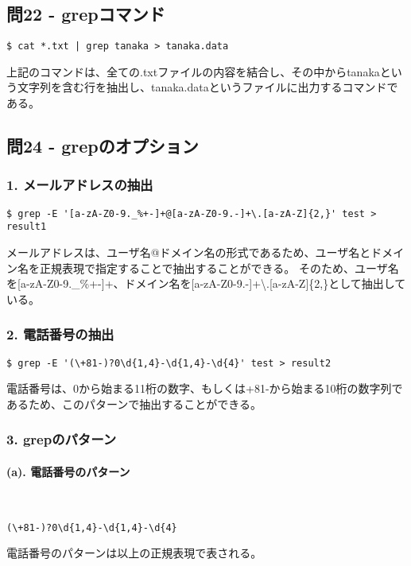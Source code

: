 \documentclass[a4paper,11pt]{jsarticle}
\begin{document}
\subsection*{問22 - grepコマンド}
\begin{lstlisting}[caption=問22の解答]
    $ cat *.txt | grep tanaka > tanaka.data
\end{lstlisting}
上記のコマンドは、全ての.txtファイルの内容を結合し、その中からtanakaという文字列を含む行を抽出し、tanaka.dataというファイルに出力するコマンドである。

\subsection*{問24 - grepのオプション}
\subsubsection*{1. メールアドレスの抽出}
\begin{lstlisting}[caption=問24-1の解答]
    $ grep -E '[a-zA-Z0-9._%+-]+@[a-zA-Z0-9.-]+\.[a-zA-Z]{2,}' test > result1
\end{lstlisting}
メールアドレスは、ユーザ名@ドメイン名の形式であるため、ユーザ名とドメイン名を正規表現で指定することで抽出することができる。
そのため、ユーザ名を[a-zA-Z0-9.\_\%+-]+、ドメイン名を[a-zA-Z0-9.-]+\textbackslash.[a-zA-Z]\{2,\}として抽出している。

\subsubsection*{2. 電話番号の抽出}
\begin{lstlisting}[caption=問24-2の解答]
    $ grep -E '(\+81-)?0\d{1,4}-\d{1,4}-\d{4}' test > result2
\end{lstlisting}
電話番号は、0から始まる11桁の数字、もしくは+81-から始まる10桁の数字列であるため、このパターンで抽出することができる。

\subsubsection*{3. grepのパターン}
\paragraph*{(a). 電話番号のパターン}\quad\\
\begin{lstlisting}[caption=問24-3(a)の解答]
    (\+81-)?0\d{1,4}-\d{1,4}-\d{4}
\end{lstlisting}
電話番号のパターンは以上の正規表現で表される。
\end{document}
